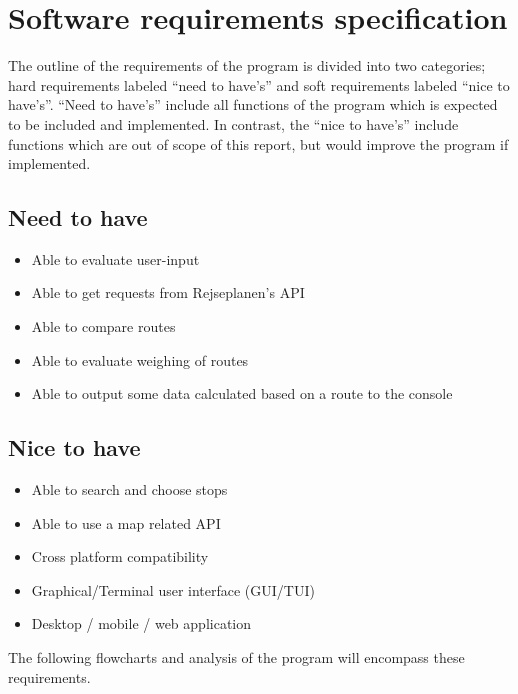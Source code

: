 \section{Software requirements specification}\label{sec:software-requirements-specification}

The outline of the requirements of the program is divided into two categories; hard requirements labeled ``need to
have's'' and soft requirements labeled ``nice to have's''.
``Need to have's'' include all functions of the program which is expected to be included and implemented.
In contrast, the ``nice to have's'' include functions which are out of scope of this report, but would improve the
program if implemented.

\subsection{Need to have}\label{subsec:need-to-have}

\begin{itemize}
    \item Able to evaluate user-input
    \item Able to get requests from Rejseplanen’s API
    \item Able to compare routes
    \item Able to evaluate weighing of routes
    \item Able to output some data calculated based on a route to the console
\end{itemize}

\subsection{Nice to have}\label{subsec:nice-to-have}

\begin{itemize}
    \item Able to search and choose stops
    \item Able to use a map related API
    \item Cross platform compatibility
    \item Graphical/Terminal user interface (GUI/TUI)
    \item Desktop / mobile / web application
\end{itemize}

The following flowcharts and analysis of the program will encompass these requirements.
